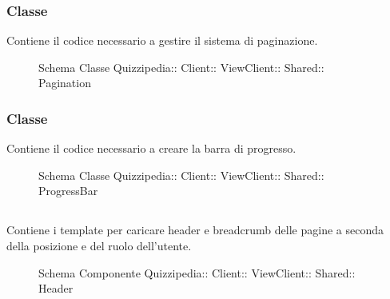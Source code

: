 \subsubsection{Classe }
Contiene il codice necessario a gestire il sistema di paginazione.
\begin{figure}[H]
\centering
\noindent{}
\caption[Schema Classe Pagination]{Schema Classe Quizzipedia:: Client:: ViewClient:: Shared:: Pagination}
\end{figure}
\subsubsection{Classe }
Contiene il codice necessario a creare la barra di progresso.
\begin{figure}[H]
\centering
\noindent{}
\caption[Schema Classe ProgressBar]{Schema Classe Quizzipedia:: Client:: ViewClient:: Shared:: ProgressBar}
\end{figure}
\subsection{}
Contiene i template per caricare header e breadcrumb delle pagine a seconda della posizione e del ruolo dell'utente.
\begin{figure}[H]
\centering
\noindent{}
\caption[Schema Componente Quizzipedia::Client::ViewClient::Shared::Header]{Schema Componente Quizzipedia:: Client:: ViewClient:: Shared:: Header}
\end{figure}
